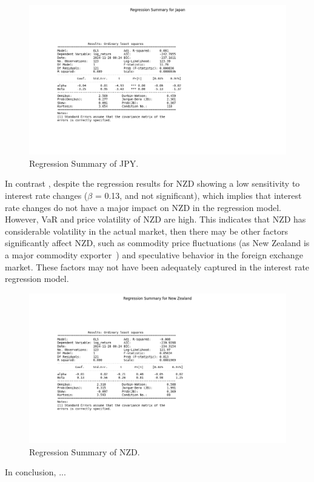 \documentclass{article}
\begin{document}
\begin{figure}[h]
    \centering  \includegraphics[width=0.75\linewidth]{reports/figures/regression_summary_Japan.png}
    \caption{Regression Summary of JPY.}
    \label{fig:regression_summary_Japan}
\end{figure}

In contrast , despite the regression results for NZD showing a low sensitivity to interest rate changes ($\beta$ = 0.13, and not significant), which implies that interest rate changes do not have a major impact on NZD in the regression model. However, VaR and price volatility of NZD are high. This indicates that NZD has considerable volatility in the actual market, then there may be other factors significantly affect NZD, such as commodity price fluctuations (as New Zealand is a major commodity exporter~\cite{blundell1990exchange}) and speculative behavior in the foreign exchange market. These factors may not have been adequately captured in the interest rate regression model.

\begin{figure}[h]
    \centering  \includegraphics[width=0.75\linewidth]{reports/figures/regression_summary_New Zealand.png}
    \caption{Regression Summary of NZD.}
    \label{fig:regression_summary_New Zealand}
\end{figure}

In conclusion, ...
\end{document}

